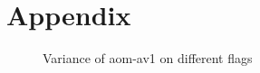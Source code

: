 \section{Appendix} \label{sec:appendix}

\begin{figure}[H]
  \centering
  
  \caption{Variance of aom-av1 on different flags}
  \label{fig:EncoderModeSpeed6TwoPassInputBosphorus4K}
\end{figure}
